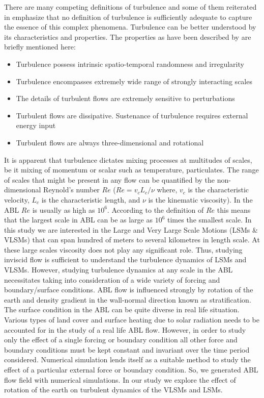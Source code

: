 There are many competing definitions of turbulence and some of them reiterated in \cite{hinze_book_75, tsinober_book_2001} emphasize that no definition of turbulence is sufficiently adequate to capture the essence of this complex phenomena. Turbulence can be better understood by its characteristics and properties. The properties as have been described by \citet{tsinober_book_2001} are briefly mentioned here: 
\begin{itemize}
	\item Turbulence possess  intrinsic spatio-temporal randomness and irregularity
	\item Turbulence encompasses extremely wide range of strongly interacting scales
	\item The details of turbulent flows are extremely sensitive to perturbations 
	\item Turbulent flows are dissipative. Sustenance of turbulence requires external energy input
	\item Turbulent flows are always three-dimensional and rotational
\end{itemize}
It is apparent that turbulence dictates mixing processes at multitudes of scales, be it mixing of momentum or scalar such as temperature, particulates. The range of scales that might be present in any flow can be quantified by the non-dimensional Reynold's number $Re$ ($Re = v_c L_c/\nu$ where, $v_c$ is the characteristic velocity, $L_c$ is the characteristic length, and $\nu$ is the kinematic viscosity). In the ABL $Re$ is usually as high as $10^6$. According to the definition of $Re$ this means that the largest scale in ABL can be as large as $10^6$ times the smallest scale. In this study we are interested in the Large and Very Large Scale Motions (LSMs \& VLSMs) that can span hundred of meters to several kilometres in length scale. At these large scales viscosity does not play any significant role. Thus, studying inviscid flow is sufficient to understand the turbulence dynamics of LSMs and VLSMs. However, studying turbulence dynamics at any scale in the ABL necessitates taking into consideration of a wide variety of forcing and boundary/surface conditions. ABL flow is influenced strongly by rotation of the earth and density gradient in the wall-normal direction known as stratification. The surface condition in the ABL can be quite diverse in real life situation. Various types of land cover and surface heating due to solar radiation needs to be accounted for in the study of a real life ABL flow. However, in order to study only the effect of a single forcing or boundary condition all other force and boundary conditions must be kept constant and invariant over the time period considered. Numerical simulation lends itself as a suitable method to study the effect of a particular external force or boundary condition. So, we generated ABL flow field with numerical simulations. In our study we explore the effect of rotation of the earth on turbulent dynamics of the VLSMs and LSMs.    

